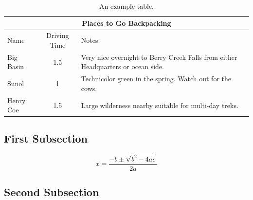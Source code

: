 \lipsum[6]

\begin{table}
 \centering
\begin{tabular}{|l|c|p{3.5in}|}
\hline
\multicolumn{3}{|c|}{Places to Go Backpacking}\\ \hline
Name        &Driving Time   &Notes\\ \hline
Big Basin   &1.5            &Very nice overnight to Berry Creek Falls from either Headquarters or ocean side.\\ \hline
Sunol       &1              &Technicolor green in the spring. Watch out for the cows.\\ \hline
Henry Coe   &1.5            &Large wilderness nearby suitable for multi-day treks.\\ \hline
\end{tabular}
\caption{An example table.}\label{tbl:example}
\end{table}

\subsection{First Subsection}
\lipsum[7]

\begin{equation}\label{eqn:example}
x = \frac {-b \pm \sqrt {b^2 - 4ac}}{2a}
\end{equation}

\subsection{Second Subsection}
\lipsum[8] 